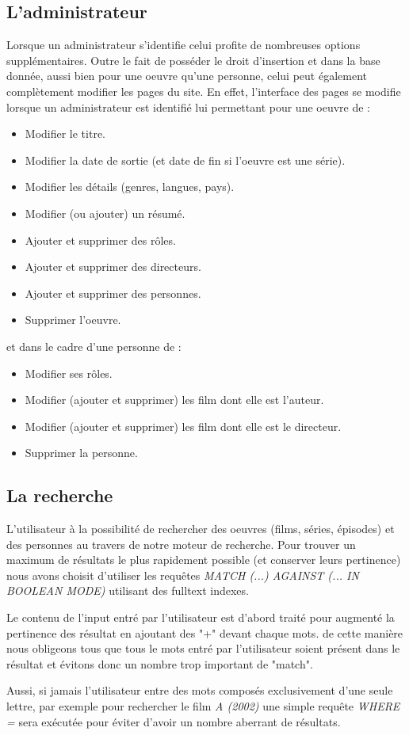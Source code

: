 \documentclass[10pt,a4paper]{article}
\begin{document}
\subsection{L'administrateur}
Lorsque un administrateur s'identifie celui profite de nombreuses options supplémentaires. Outre le fait de posséder le droit d'insertion et dans la base donnée, aussi bien pour une oeuvre qu'une personne, celui peut également complètement modifier les pages du site. En effet, l'interface des pages se modifie lorsque un administrateur est identifié lui permettant pour une oeuvre de :
\vskip 3pt
\begin{itemize}
\item Modifier le titre.
\item Modifier la date de sortie (et date de fin si l'oeuvre est une série).
\item Modifier les détails (genres, langues, pays).
\item Modifier (ou ajouter) un résumé.
\item Ajouter et supprimer des rôles.
\item Ajouter et supprimer des directeurs.
\item Ajouter et supprimer des personnes.
\item Supprimer l'oeuvre.
\end{itemize}

\vskip 10pt
et dans le cadre d'une personne de :
\vskip 3pt
\begin{itemize}
\item Modifier ses rôles.
\item Modifier (ajouter et supprimer) les film dont elle est l’auteur.
\item Modifier (ajouter et supprimer) les film dont elle est le directeur.
\item Supprimer la personne.
\end{itemize}

\subsection{La recherche}

L'utilisateur à la possibilité de rechercher des oeuvres (films, séries, épisodes) et des personnes au travers de notre moteur de recherche. Pour trouver un maximum de résultats le plus rapidement possible (et conserver leurs pertinence) nous avons choisit d'utiliser les requêtes \textit{MATCH (...) AGAINST (... IN BOOLEAN MODE)} utilisant des fulltext indexes. 
\par 
Le contenu de l'input entré par l'utilisateur est d'abord traité pour augmenté la pertinence des résultat en ajoutant des "+" devant chaque mots. de cette manière nous obligeons tous que tous le mots entré par l'utilisateur soient présent dans le résultat et évitons donc un nombre trop important de "match".
\par
Aussi, si jamais l'utilisateur entre des mots composés exclusivement d'une seule lettre, par exemple pour rechercher le film \textit{A (2002)} une simple requête \textit{WHERE = }
sera exécutée pour éviter d'avoir un nombre aberrant de résultats.
\end{document}
